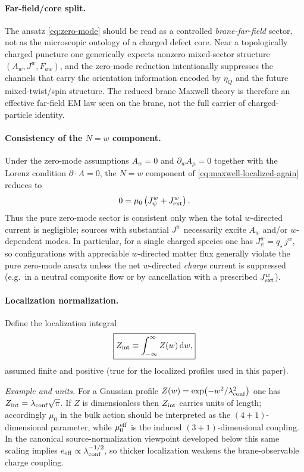 \documentclass[11pt]{article}
\newcommand{\etaQ}{\eta_Q}
\newcommand{\eeff}{e_{\rm eff}}
\newcommand{\qstar}{q_\star}
\newcommand{\Zint}{Z_{\rm int}}
\begin{document}
\paragraph{Far-field/core split.}
The ansatz \eqref{eq:zero-mode} should be read as a controlled \emph{brane-far-field} sector, not as the microscopic ontology of a charged defect core. Near a topologically charged puncture one generically expects nonzero mixed-sector structure $(A_w,J^w,F_{a w})$, and the zero-mode reduction intentionally suppresses the channels that carry the orientation information encoded by $\etaQ$ and the future mixed-twist/spin structure. The reduced brane Maxwell theory is therefore an effective far-field EM law seen on the brane, not the full carrier of charged-particle identity.

\paragraph{Consistency of the \texorpdfstring{$N=w$}{N=w} component.} Under the zero-mode assumptions $A_w=0$ and $\partial_w A_\mu=0$ together with the Lorenz condition $\partial\!\cdot\!A=0$, the $N=w$ component of \eqref{eq:maxwell-localized-again} reduces to
\begin{equation}
0=\mu_0\left(J_\psi^w+J_{\rm ext}^w\right).
\end{equation}
Thus the pure zero-mode sector is consistent only when the total $w$-directed current is negligible; sources with substantial $J^w$ necessarily excite $A_w$ and/or $w$-dependent modes.
In particular, for a single charged species one has $J_\psi^w=\qstar\,j^w$, so configurations with appreciable $w$-directed matter flux generally violate the pure zero-mode ansatz unless the net $w$-directed \emph{charge} current is suppressed (e.g.\ in a neutral composite flow or by cancellation with a prescribed $J_{\rm ext}^w$).


\paragraph{Localization normalization.}
Define the localization integral
\begin{equation}
\boxed{
Z_{\rm int} \equiv \int_{-\infty}^{\infty} Z(w)\,\dd w,
}
\label{eq:Zint}
\end{equation}
assumed finite and positive (true for the localized profiles used in this paper).

\noindent\emph{Example and units.} For a Gaussian profile $Z(w)=\exp(-w^2/\lambda_{\rm conf}^2)$ one has $\Zint=\lambda_{\rm conf}\sqrt{\pi}$. If $Z$ is dimensionless then $\Zint$ carries units of length; accordingly $\mu_0$ in the bulk action should be interpreted as the $(4+1)$-dimensional parameter, while $\mu_0^{\rm eff}$ is the induced $(3+1)$-dimensional coupling. In the canonical source-normalization viewpoint developed below this same scaling implies $\eeff\propto \lambda_{\rm conf}^{-1/2}$, so thicker localization weakens the brane-observable charge coupling.
\end{document}
